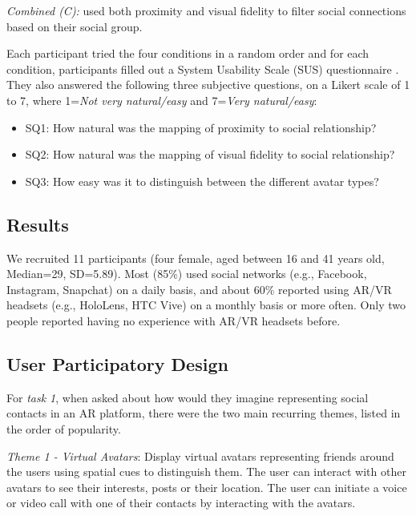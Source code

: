 \textit{Combined (C):} used both proximity and visual fidelity to filter social connections based on their social group.

Each participant tried the four conditions in a random order and for each condition, participants filled out a System Usability Scale (SUS) questionnaire \cite{brooke1996sus}. They also answered the following three subjective questions, on a Likert scale of 1 to 7, where 1=\textit{Not very natural/easy} and 7=\textit{Very natural/easy}:

\begin{itemize}
	\item SQ1: How natural was the mapping of proximity to social relationship?
	\item SQ2: How natural was the mapping of visual fidelity to social relationship?
	\item SQ3: How easy was it to distinguish between the different avatar types?
\end{itemize}

\subsection{Results}

We recruited 11 participants (four female, aged between 16 and 41 years old, Median=29, SD=5.89). Most (85\%) used social networks (e.g., Facebook, Instagram, Snapchat) on a daily basis, and about 60\% reported using AR/VR headsets (e.g., HoloLens, HTC Vive) on a monthly basis or more often. Only two people reported having no experience with AR/VR headsets before.

\subsection{User Participatory Design}


For \textit{task 1}, when asked about how would they imagine representing social contacts in an AR platform, there were the two main recurring themes, listed in the order of popularity.

\textit{Theme 1 - Virtual Avatars}: Display virtual avatars representing friends around the users using spatial cues to distinguish them. The user can interact with other avatars to see their interests, posts or their location. The user can initiate a voice or video call with one of their contacts by interacting with the avatars.

